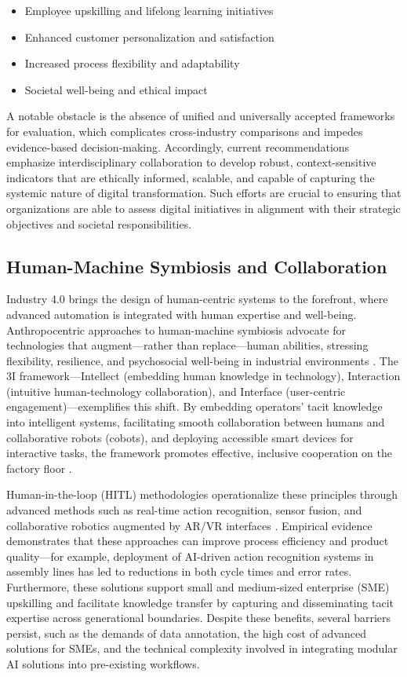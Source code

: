 \begin{itemize}
    \item Employee upskilling and lifelong learning initiatives
    \item Enhanced customer personalization and satisfaction
    \item Increased process flexibility and adaptability
    \item Societal well-being and ethical impact
\end{itemize}

A notable obstacle is the absence of unified and universally accepted frameworks for evaluation, which complicates cross-industry comparisons and impedes evidence-based decision-making. Accordingly, current recommendations emphasize interdisciplinary collaboration to develop robust, context-sensitive indicators that are ethically informed, scalable, and capable of capturing the systemic nature of digital transformation. Such efforts are crucial to ensuring that organizations are able to assess digital initiatives in alignment with their strategic objectives and societal responsibilities.

\subsection{Human-Machine Symbiosis and Collaboration}

Industry 4.0 brings the design of human-centric systems to the forefront, where advanced automation is integrated with human expertise and well-being. Anthropocentric approaches to human-machine symbiosis advocate for technologies that augment—rather than replace—human abilities, stressing flexibility, resilience, and psychosocial well-being in industrial environments \cite{ref90}. The 3I framework—Intellect (embedding human knowledge in technology), Interaction (intuitive human-technology collaboration), and Interface (user-centric engagement)—exemplifies this shift. By embedding operators’ tacit knowledge into intelligent systems, facilitating smooth collaboration between humans and collaborative robots (cobots), and deploying accessible smart devices for interactive tasks, the framework promotes effective, inclusive cooperation on the factory floor \cite{ref90}.

Human-in-the-loop (HITL) methodologies operationalize these principles through advanced methods such as real-time action recognition, sensor fusion, and collaborative robotics augmented by AR/VR interfaces \cite{ref17,ref27,ref29,ref37,ref38,ref42,ref43,ref45,ref46,ref54,ref89}. Empirical evidence demonstrates that these approaches can improve process efficiency and product quality—for example, deployment of AI-driven action recognition systems in assembly lines has led to reductions in both cycle times and error rates. Furthermore, these solutions support small and medium-sized enterprise (SME) upskilling and facilitate knowledge transfer by capturing and disseminating tacit expertise across generational boundaries. Despite these benefits, several barriers persist, such as the demands of data annotation, the high cost of advanced solutions for SMEs, and the technical complexity involved in integrating modular AI solutions into pre-existing workflows.

